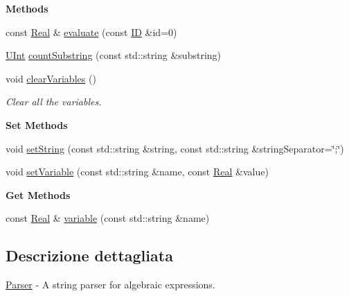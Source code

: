 \begin{Indent}{\bf Methods}\par
\begin{DoxyCompactItemize}
\item 
const \hyperlink{namespaceLifeV_ad58c7402b26e5087b634b25d029c9c32}{Real} \& \hyperlink{classLifeV_1_1Parser_a51d84fd4ae6d420620e7beee58fad673}{evaluate} (const \hyperlink{namespaceLifeV_a7c0e64679fcd30daa5471b87a57601e9}{I\-D} \&id=0)
\item 
\hyperlink{namespaceLifeV_a4bd093cf6b0d5b57b2d89e0e90d610b7}{U\-Int} \hyperlink{classLifeV_1_1Parser_a37ae3af9abcf72ca8e1537ec771b523a}{count\-Substring} (const std\-::string \&substring)
\item 
void \hyperlink{classLifeV_1_1Parser_acbc44ff1f0b0074f071ea264a95cb9e7}{clear\-Variables} ()
\begin{DoxyCompactList}\small\item\em Clear all the variables. \end{DoxyCompactList}\end{DoxyCompactItemize}
\end{Indent}
\begin{Indent}{\bf Set Methods}\par
\begin{DoxyCompactItemize}
\item 
void \hyperlink{classLifeV_1_1Parser_ac05769e836a0dc95d9c020df361a5194}{set\-String} (const std\-::string \&string, const std\-::string \&string\-Separator=\char`\"{};\char`\"{})
\item 
void \hyperlink{classLifeV_1_1Parser_aa2b362e12b8feb60231705d499c9fbae}{set\-Variable} (const std\-::string \&name, const \hyperlink{namespaceLifeV_ad58c7402b26e5087b634b25d029c9c32}{Real} \&value)
\end{DoxyCompactItemize}
\end{Indent}
\begin{Indent}{\bf Get Methods}\par
\begin{DoxyCompactItemize}
\item 
const \hyperlink{namespaceLifeV_ad58c7402b26e5087b634b25d029c9c32}{Real} \& \hyperlink{classLifeV_1_1Parser_a9fa902c13c73a3b1bc6db2b5e5c5c93d}{variable} (const std\-::string \&name)
\end{DoxyCompactItemize}
\end{Indent}


\subsection{Descrizione dettagliata}
\hyperlink{classLifeV_1_1Parser}{Parser} -\/ A string parser for algebraic expressions. 

